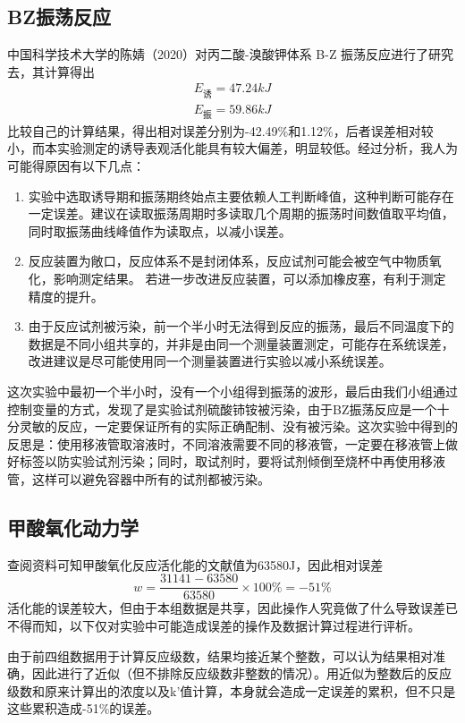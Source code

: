 \documentclass[12pt,hyperref,a4paper,UTF8]{ctexart}
\begin{document}
\subsection{BZ振荡反应}
	中国科学技术大学的陈婧（2020）对丙二酸-溴酸钾体系 B-Z 振荡反应进行了研究去，其计算得出
\begin{align*}
	E_{\text{诱}}=47.24 kJ \\
	E_{\text{振}}=59.86 kJ
\end{align*}
	比较自己的计算结果，得出相对误差分别为-42.49\%和1.12\%，后者误差相对较小，而本实验测定的诱导表观活化能具有较大偏差，明显较低。经过分析，我人为可能得原因有以下几点：
\begin{enumerate}
	\item 实验中选取诱导期和振荡期终始点主要依赖人工判断峰值，这种判断可能存在一定误差。建议在读取振荡周期时多读取几个周期的振荡时间数值取平均值，同时取振荡曲线峰值作为读取点，以减小误差。
	\item 反应装置为敞口，反应体系不是封闭体系，反应试剂可能会被空气中物质氧化，影响测定结果。
	若进一步改进反应装置，可以添加橡皮塞，有利于测定精度的提升。
	\item 由于反应试剂被污染，前一个半小时无法得到反应的振荡，最后不同温度下的数据是不同小组共享的，并非是由同一个测量装置测定，可能存在系统误差，改进建议是尽可能使用同一个测量装置进行实验以减小系统误差。
\end{enumerate}
这次实验中最初一个半小时，没有一个小组得到振荡的波形，最后由我们小组通过控制变量的方式，发现了是实验试剂硫酸铈铵被污染，由于BZ振荡反应是一个十分灵敏的反应，一定要保证所有的实际正确配制、没有被污染。这次实验中得到的反思是：使用移液管取溶液时，不同溶液需要不同的移液管，一定要在移液管上做好标签以防实验试剂污染；同时，取试剂时，要将试剂倾倒至烧杯中再使用移液管，这样可以避免容器中所有的试剂都被污染。

\subsection{甲酸氧化动力学}
查阅资料可知甲酸氧化反应活化能的文献值为63580J，因此相对误差
$$
w=\frac{31141-63580}{63580}\times 100 \%=-51\%
$$
	活化能的误差较大，但由于本组数据是共享，因此操作人究竟做了什么导致误差已不得而知，以下仅对实验中可能造成误差的操作及数据计算过程进行评析。

	由于前四组数据用于计算反应级数，结果均接近某个整数，可以认为结果相对准确，因此进行了近似（但不排除反应级数非整数的情况）。用近似为整数后的反应级数和原来计算出的浓度以及k'值计算，本身就会造成一定误差的累积，但不只是这些累积造成-51\%的误差。
\end{document}
